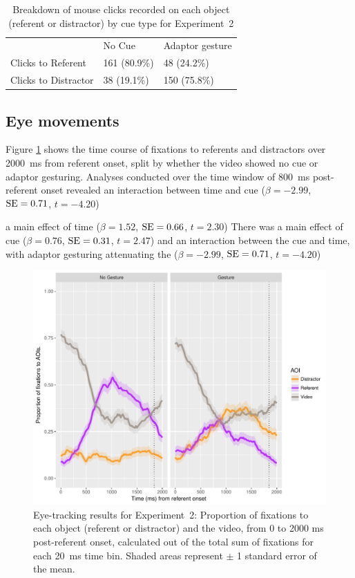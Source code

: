 \documentclass[a4paper,man,natbib]{apa6}
\newcommand{\resultsLM}[3]{$\beta = #1$, $\textnormal{SE} = #2$, $t #3$}
\begin{document}
\begin{table}
\caption{Breakdown of mouse clicks recorded on each object (referent or distractor) by cue type for Experiment~2}
\label{table:v2_clicks}
\begin{tabularx}{\linewidth}{YYY}
\hline
& No Cue & Adaptor gesture \\
Clicks to Referent & 161 (80.9\%) & 48 (24.2\%)  \\
Clicks to Distractor & 38 (19.1\%) & 150 (75.8\%)  \\
\hline
\end{tabularx}
\end{table}


\subsection{Eye movements}
Figure \ref{fig:v2_eye} shows the time course of fixations to referents and distractors over 2000~ms from referent onset, split by whether the video showed no cue or adaptor gesturing.
Analyses conducted over the time window of 800~ms post-referent onset revealed an interaction between time and cue (\resultsLM{-2.99}{0.71}{=-4.20})

a main effect of time (\resultsLM{1.52}{0.66}{=2.30})
There was a main effect of cue (\resultsLM{0.76}{0.31}{=2.47}) and an interaction between the cue and time, with adaptor gesturing attenuating the  (\resultsLM{-2.99}{0.71}{=-4.20})

\begin{figure}[Ht]
  \centering
	\includegraphics[width=\linewidth]{./img/e8_fixations.pdf}
  \caption{Eye-tracking results for Experiment~2: Proportion of fixations to each object (referent or distractor) and the video, from 0 to 2000 ms post-referent onset, calculated out of the total sum of fixations for each 20~ms time bin. Shaded areas represent $\pm$ 1 standard error of the mean.}
  \label{fig:v2_eye}
\end{figure}
\end{document}
